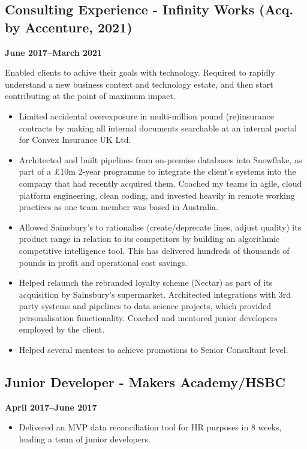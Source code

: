 \documentclass[a4paper]{scrartcl}
\begin{document}
\subsection*{Consulting Experience - Infinity Works (Acq. by Accenture, 2021)}
\textbf{June 2017--March 2021}

Enabled clients to achive their goals with technology. Required to rapidly understand a new business context and technology estate, and then start contributing at the point of maximum impact.
\begin{itemize}
	\item Limited accidental overexposure in multi-million pound
	      (re)insurance contracts by making
	      all internal documents searchable at an internal portal for Convex
	      Insurance UK Ltd.
	\item Architected and built pipelines from on-premise databases into
	      Snowflake, as part of a £10m 2-year programme to integrate the
	      client's systems into the company that had recently acquired them.
	      Coached my teams in agile, cloud platform engineering, clean
	      coding,
	      and invested heavily in remote working practices as one team member
	      was based
	      in Australia.
	\item Allowed Sainsbury's to rationalise (create/deprecate lines, adjust
	      quality) its product range in relation to its competitors by
	      building an
	      algorithmic competitive intelligence tool. This has delivered
	      hundreds of
	      thousands of pounds in profit and operational cost savings.
	\item Helped relaunch the rebranded loyalty scheme (Nectar) as part of its acquisition by Sainsbury's supermarket. Architected integrations with 3rd party systems
	      and pipelines to data science projects, which provided personalisation functionality. Coached and mentored junior
	      developers
	      employed by the client.
	\item Helped several mentees to achieve
	      promotions to Senior Consultant level.
\end{itemize}

\subsection*{Junior Developer - Makers Academy/HSBC}
\textbf{April 2017--June 2017}
\begin{itemize}
	\item Delivered an MVP data reconciliation tool for HR purposes in 8
	      weeks, leading a team of junior developers.
\end{itemize}
\end{document}
